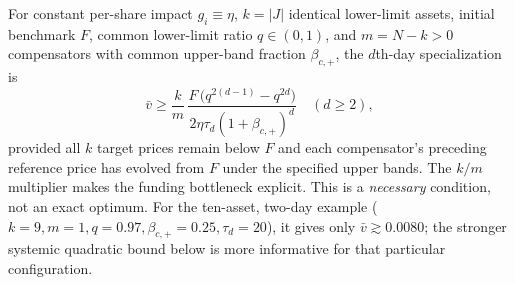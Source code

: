 \documentclass[review,hidelinks,onefignum,onetabnum]{siamonline250211}
\begin{document}
For constant per-share impact $g_i\equiv\eta$, $k=|J|$ identical lower-limit assets, initial benchmark $F$, common lower-limit ratio $q\in(0,1)$, and $m=N-k>0$ compensators with common upper-band fraction $\beta_{c,+}$, the $d$th-day specialization is
\begin{equation}\label{eq:cut-special}
\boxed{\bar v\ge \frac{k}{m}\,
\frac{F\,\big(q^{2(d-1)}-q^{2d}\big)}{2\eta\tau_d(1+\beta_{c,+})^{d}}\quad(d\ge2),}
\end{equation}
provided all $k$ target prices remain below $F$ and each compensator's preceding reference price has evolved from $F$ under the specified upper bands. The $k/m$ multiplier makes the funding bottleneck explicit. This is a \emph{necessary} condition, not an exact optimum. For the ten-asset, two-day example ($k=9,m=1,q=0.97,\beta_{c,+}=0.25,\tau_d=20$), it gives only $\bar v\gtrsim 0.0080$; the stronger systemic quadratic bound below is more informative for that particular configuration.
\end{document}
